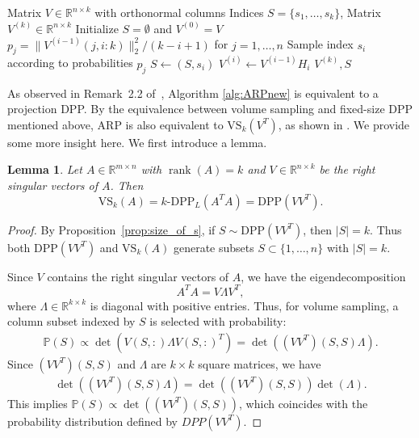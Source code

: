 \documentclass[11pt]{article}
\newtheorem{lemma}{Lemma}[section]
\newcommand{\be}{\begin{eqnarray}}
\newcommand{\ee}{\end{eqnarray}}
\newcommand{\<}{\langle}
\renewcommand{\>}{\rangle}
\begin{document}
\begin{algorithm}[H]
\caption{Adaptive Randomized Pivoting for CSSP (ARP)}
\label{alg:ARPnew}
\begin{algorithmic}[1]
\Require Matrix $V \in \mathbb{R}^{n \times k}$ with orthonormal columns
\Ensure Indices $S=\{s_1, \ldots, s_k\}$, Matrix $V^{(k)}\in \mathbb{R}^{n\times k}$
    \State Initialize $S = \emptyset$ and $V^{(0)} = V$
        \State $p_j = \|V^{(i-1)}(j,i:k)\|_2^2/(k-i+1)$ for $j=1,\ldots,n$
        \State Sample index $s_i$ according to probabilities $p_j$
        \State $S \gets (S ,s_i)$
        \State $V^{(i)} \gets V^{(i-1)} H_i$
    \EndFor
    \State \Return $V^{(k)},S$
\EndFunction
\end{algorithmic}
\end{algorithm}
    
As observed in Remark~2.2 of~\cite{cortinovis2025arp}, Algorithm \ref{alg:ARPnew} is equivalent to a projection DPP. By the equivalence between volume sampling and fixed-size DPP mentioned above, ARP is also equivalent to $\mathrm{VS}_k(V^T)$, as shown in \cite{epperly2026adaptiverandomizedpivotingvolume}. We provide some more insight here. We first introduce a lemma. 

\begin{lemma}
Let $A \in \mathbb{R}^{m\times n}$ with $\operatorname{rank}(A)=k$ and $V \in \mathbb{R}^{n\times k}$ be the right singular vectors of $A$.
Then
\[
\mathrm{VS}_k(A) = k\text{-}\mathrm{DPP}_L(A^TA) = \mathrm{DPP}(VV^T).
\]

\end{lemma}

\begin{proof}
By Proposition~\ref{prop:size_of_s}, if $S\sim \mathrm{DPP}(VV^T)$, then $|S|=k$. 
Thus both $\mathrm{DPP}(VV^T)$ and $\mathrm{VS}_k(A)$ generate subsets 
$S\subset \{1,\dots,n\}$ with $|S|=k$.

Since $V$ contains the right singular vectors of $A$, we have the eigendecomposition 
\[
A^TA = V\Lambda V^T,
\]
where $\Lambda\in\mathbb{R}^{k\times k}$ is diagonal with positive entries.
Thus, for volume sampling, a column subset indexed by $S$ is selected with probability:
\be
\mathbb{P}(S) \propto \det( V(S,:)\Lambda V(S,:)^T) = \det( (VV^T)(S,S)\Lambda ).
\ee
Since $(VV^T)(S,S)$ and $\Lambda$ are $k\times k$ square matrices, we have
\be
\det( (VV^T)(S,S)\Lambda ) = \det( (VV^T)(S,S) )\det(\Lambda).
\ee
This implies $\mathbb{P}(S)\propto \det( (VV^T)(S,S) )$, which coincides with the probability distribution defined by $DPP(VV^T)$. 
\end{proof}
\end{document}
